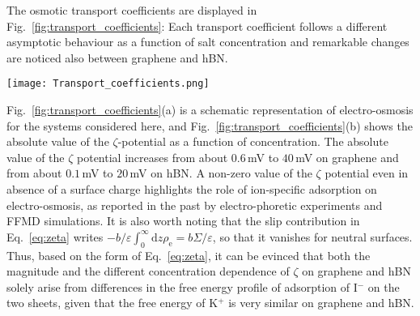 \documentclass[journal=ancac3,manuscript=article,layout=twocolumn]{achemso}
\newcommand{\eps}{\varepsilon}
\newcommand{\rhoe}{\rho_\text{e}}
\newcommand{\ns}{n_\text{s}}
\begin{document}
The osmotic transport coefficients
are displayed in Fig.~\ref{fig:transport_coefficients}:
Each transport coefficient follows
a different asymptotic behaviour
as a function of salt concentration
and remarkable changes are noticed also
between graphene and hBN.
%
\begin{figure*}[thb!]
\texttt{[image: Transport\_coefficients.png]}
\caption{\label{fig:transport_coefficients}
Molecular representation and concentration dependent
scaling of osmotic transport at the aqueous
graphene and hBN interfaces.
Schematic of the electro-osmotic velocity
profile $v_\mathrm{eo}(z)$ arising from
an electric field $E$ (a) and absolute
value of the $\zeta$ potential as a function of
salt concentration (b);
Schematic of the diffusio-osmotic velocity
profile $v_\mathrm{do}(z)$ in response to a concentration gradient $-k_\mathrm{B}T (\nabla\ns)/\ns$ (c) and absolute
value of the diffusio-osmotic coefficient $|D_\mathrm{DO}|$ (d);
Representation of the
diffusio-osmotic current $I_e$ arising from a concentration gradient
$-k_\mathrm{B}T (\nabla\ns)/\ns$ (e), and
absolute value of the diffusio-osmotic conductivity $|K_\mathrm{osm}|$ (f).
The transport coefficients display different
 scaling behaviours (see dashed lines).
The symbols are obtained from the numerical
integration of Eqs.~(\ref{eq:zeta}-\ref{eq:K_osm2}),
whereas the solid and dotted lines are from the effective surface charge model.
In (d) and (f) the arrows point to a
sign change, whereby $D_\text{DO}$
and $K_\text{osm}$
are negative on hBN at concentrations $\gtrsim 1$\,M, as indicated also
by the empty symbols and dotted line in (d).
In (a) $v_\mathrm{eo}(z)$ is not enhanced by slippage,
opposite to $v_\mathrm{do}(z)$ in (c) and (e), see text for details.}
\end{figure*}
%
Fig.~\ref{fig:transport_coefficients}(a)
is a schematic representation of electro-osmosis
for the systems considered here, and Fig.~\ref{fig:transport_coefficients}(b)
shows the absolute value of the
$\zeta$-potential as a function of
concentration. The absolute value of the $\zeta$ potential
increases from about $0.6$\,mV to
$40$\,mV on graphene and
from about $0.1$\,mV to
$20$\,mV on hBN.
A non-zero value of the $\zeta$
potential even in absence of a surface
charge highlights the
role of ion-specific adsorption on electro-osmosis,
as reported in the past by
electro-phoretic experiments and FFMD
simulations\cite{huang2007ion,petrache2006salt}.
It is also worth noting that
the slip contribution in Eq.~\eqref{eq:zeta} writes $-b/\eps \int_0^\infty \mathrm{d}z \rhoe = b \Sigma / \eps$, so that it vanishes for neutral surfaces\cite{huang2007ion}.
Thus, based on the form of Eq.~\eqref{eq:zeta},
it can be evinced that
both the magnitude and the different concentration dependence
of $\zeta$ on graphene and hBN solely arise from
differences in the free
energy profile of adsorption
of I$^{-}$ on the two sheets,
given that the free energy of K$^{+}$
is very similar on graphene and hBN.
\end{document}
